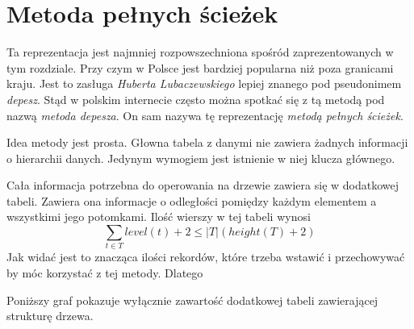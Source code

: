 \section{Metoda pełnych ścieżek}
% 




Ta reprezentacja jest najmniej rozpowszechniona spośród zaprezentowanych w tym rozdziale.
Przy czym w Polsce jest bardziej popularna niż poza granicami kraju.
Jest to zasługa \emph{Huberta Lubaczewskiego} lepiej znanego pod pseudonimem \emph{depesz}.
Stąd w polskim internecie często można spotkać się z tą metodą pod nazwą \emph{metoda depesza}.
On sam nazywa tę reprezentację \emph{metodą pełnych ścieżek}.




Idea metody jest prosta. 
Głowna tabela z danymi nie zawiera żadnych informacji o hierarchii danych. 
Jedynym wymogiem jest istnienie w niej klucza głównego.

Cała informacja potrzebna do operowania na drzewie zawiera się w dodatkowej tabeli. 
Zawiera ona informacje o odległości pomiędzy każdym elementem a wszystkimi jego potomkami.
Ilość wierszy w tej tabeli wynosi
\begin{displaymath}
    \sum_{t \in T} level(t) + 2 \leq |T|(height(T) + 2)
\end{displaymath}
Jak widać jest to znacząca ilości rekordów, które trzeba wstawić i przechowywać by móc korzystać z tej metody.
Dlatego 

Poniższy graf pokazuje wyłącznie zawartość dodatkowej tabeli zawierającej strukturę drzewa.


